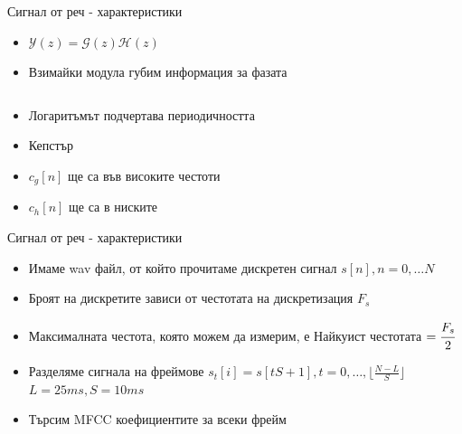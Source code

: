 \documentclass[9pt]{beamer}
\begin{document}
    \begin{frame}[t]{Сигнал от реч - характеристики}
        \begin{itemize}
            \setlength\itemsep{\fill}
            \pause
            \item $\mathcal{Y}(z) = \mathcal{G}(z)\mathcal{H}(z)$
            \pause 
            \item Взимайки модула губим информация за фазата
        \end{itemize}
        \pause
        \begin{columns}
            \begin{column}{0.48\textwidth}
            \end{column}
            \pause
            \hfill
            \begin{column}{0.48\textwidth}
            \end{column}
        \end{columns}
        \begin{itemize}
            \setlength\itemsep{\fill}
            \pause
            \item Логаритъмът подчертава периодичността
            \pause
            \item Кепстър
            \pause
            \item $c_g[n]$ ще са във високите честоти 
            \pause
            \item $c_h[n]$ ще са в ниските
        \end{itemize}
    \end{frame}

    \begin{frame}[t]{Сигнал от реч - характеристики}
        \begin{itemize}
            \setlength\itemsep{\fill}
            \pause
            \item Имаме wav файл, от който прочитаме дискретен сигнал $s[n], n = 0,\ldots N$
            \pause
            \item Броят на дискретите зависи от честотата на дискретизация $F_s$
            \pause
            \item Максималната честота, която можем да измерим, е Найкуист честотата $= \cfrac{F_s}{2}$ 
            \pause
            \item Разделяме сигнала на фреймове $s_t[i] = s[tS + 1], t = 0,\ldots, \lfloor \frac{N-L}{S} \rfloor$ 
            \pause $L = 25 ms, S = 10 ms$ 
            \pause
            \item Търсим MFCC коефициентите за всеки фрейм
        \end{itemize}
    \end{frame}
\end{document}
